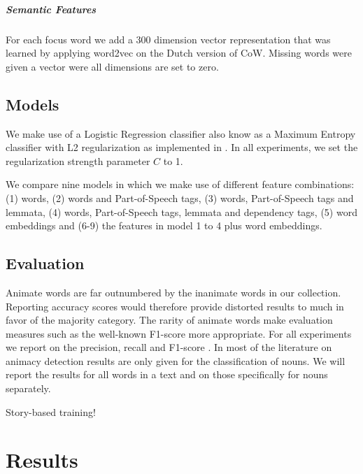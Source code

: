 \documentclass[a4paper,UKenglish]{oasics}
\begin{document}
\subparagraph*{Semantic Features}
For each focus word we add a 300 dimension vector representation that
was learned by applying word2vec on the Dutch version of CoW. Missing
words were given a vector were all dimensions are set to zero.


\subsection{Models}
We make use of a Logistic Regression classifier also know as a Maximum
Entropy classifier with L2 regularization as implemented in
\cite{sklearn}. In all experiments, we set the regularization strength
parameter $C$ to 1.

We compare nine models in which we make use of different feature
combinations: (1) words, (2) words and Part-of-Speech tags, (3)
words, Part-of-Speech tags and lemmata, (4) words, Part-of-Speech
tags, lemmata and dependency tags, (5) word embeddings and (6-9) the
features in model 1 to 4 plus word embeddings.

\subsection{Evaluation}

Animate words are far outnumbered by the inanimate words in our
collection. Reporting accuracy scores would therefore provide
distorted results to much in favor of the majority category. The
rarity of animate words make evaluation measures such as the
well-known F1-score more appropriate. For all experiments we report on
the precision, recall and F1-score \cite{rijsbergen:79}. In most of
the literature on animacy detection results are only given for the
classification of nouns. We will report the results for all words in a
text and on those specifically for nouns separately.

Story-based training!

\section{Results}\label{sec:results}
\end{document}
